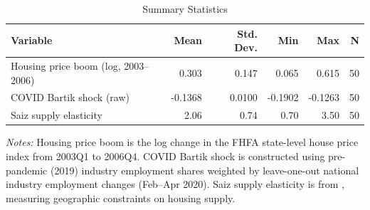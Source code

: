 \begin{table}[H]
\centering
\caption{Summary Statistics}
\begin{threeparttable}
\begin{tabular}{lrrrrr}
\toprule
Variable & Mean & Std. Dev. & Min & Max & N \\
\midrule
Housing price boom (log, 2003--2006) & 0.303 & 0.147 & 0.065 & 0.615 & 50 \\
COVID Bartik shock (raw) & -0.1368 & 0.0100 & -0.1902 & -0.1263 & 50 \\
Saiz supply elasticity & 2.06 & 0.74 & 0.70 & 3.50 & 50 \\
\bottomrule
\end{tabular}
\begin{tablenotes}[flushleft]
\small
\item \textit{Notes:} Housing price boom is the log change in the FHFA state-level house price index from 2003Q1 to 2006Q4. COVID Bartik shock is constructed using pre-pandemic (2019) industry employment shares weighted by leave-one-out national industry employment changes (Feb--Apr 2020). Saiz supply elasticity is from \citet{saiz2010geographic}, measuring geographic constraints on housing supply.
\end{tablenotes}
\end{threeparttable}
\label{tab:summary}
\end{table}
